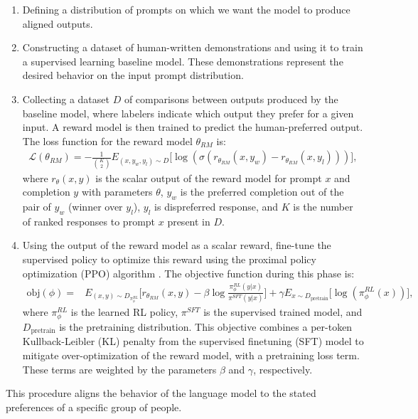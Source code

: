 \begin{enumerate}
    \item Defining a distribution of prompts on which we want the model to produce aligned outputs.
    \item Constructing a dataset of human-written demonstrations and using it to train a supervised learning baseline model. These demonstrations represent the desired behavior on the input prompt distribution.
    \item Collecting a dataset $D$ of comparisons between outputs produced by the baseline model, where labelers indicate which output they prefer for a given input. A reward model is then trained to predict the human-preferred output. The loss function for the reward model $\theta_{RM}$ is:
    \begin{align}
     \mathcal{L}(\theta_{RM}) = - \frac{1}{\binom{K}{2}} E_{(x,y_w,y_l) \sim D} \big[ \log (\sigma (r_{\theta_{RM}} (x, y_w) -r_{\theta_{RM}} (x, y_l)))  \big],
    \end{align}
    where $r_{\theta}(x,y)$ is the scalar output of the reward model for prompt $x$ and completion $y$ with parameters $\theta$, $y_w$ is the preferred completion out of the pair of $y_w$ (winner over $y_l$), $y_l$ is dispreferred response, and $K$ is the number of ranked responses to prompt $x$ present in $D$.
    
    \item Using the output of the reward model as a scalar reward, fine-tune the supervised policy to optimize this reward using the proximal policy optimization (PPO) algorithm \citep{schulman2017proximal}. The objective function during this phase is:
    \begin{align}
        \text{obj}(\phi) = & E_{(x,y) \sim D_{\pi_{\phi}^{RL}}} \big[ r_{\theta_{RM}} (x, y) - \beta \log \frac{\pi_{\phi}^{RL}(y | x)}{\pi^{SFT}(y | x)} \big] + 
        \gamma E_{x \sim D_{\text{pretrain}}} \big [  \log (\pi_{\phi}^{RL} (x))\big ],
    \end{align}
    where $\pi_{\phi}^{RL}$ is the learned RL policy, $\pi^{SFT}$ is the supervised trained model, and $D_{\text{pretrain}}$ is the pretraining distribution. This objective combines a per-token Kullback-Leibler (KL) penalty from the supervised finetuning (SFT) model to mitigate over-optimization of the reward model, with a pretraining loss term. These terms are weighted by the parameters $\beta$ and $\gamma$, respectively.
\end{enumerate}

This procedure aligns the behavior of the language model to the stated preferences of a specific group of people. 

